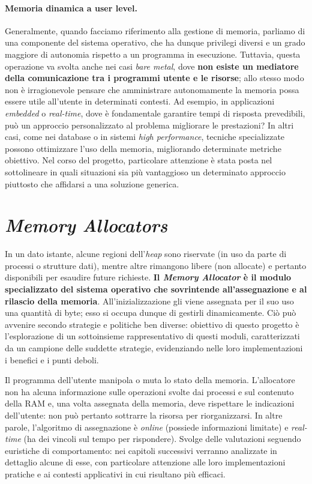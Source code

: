 \paragraph{Memoria dinamica a user level.} 
Generalmente, quando facciamo riferimento alla gestione di memoria, parliamo di una componente del sistema operativo, che ha dunque privilegi diversi e un grado maggiore di autonomia rispetto a un programma in esecuzione. Tuttavia, questa operazione va svolta anche nei casi \textit{bare metal}, dove \textbf{non esiste un mediatore della comunicazione tra i programmi utente e le risorse}; allo stesso modo non è irragionevole pensare che amministrare autonomamente la memoria possa essere utile all'utente in determinati contesti. Ad esempio, in applicazioni \textit{embedded} o \textit{real-time}, dove è fondamentale garantire tempi di risposta prevedibili, può un approccio personalizzato al problema migliorare le prestazioni? In altri casi, come nei database o in sistemi \textit{high performance}, tecniche specializzate possono ottimizzare l'uso della memoria, migliorando determinate metriche obiettivo. Nel corso del progetto, particolare attenzione è stata posta nel sottolineare in quali situazioni sia più vantaggioso un determinato approccio piuttosto che affidarsi a una soluzione generica.

\section{\textit{Memory Allocators}}

In un dato istante, alcune regioni dell'\textit{heap} sono riservate (in uso da parte di processi o strutture dati), mentre altre rimangono libere (non allocate) e pertanto disponibili per esaudire future richieste. \textbf{Il \textit{Memory Allocator} è il modulo specializzato del sistema operativo che sovrintende all'assegnazione e al rilascio della memoria}. All'inizializzazione gli viene assegnata per il suo uso una quantità di byte; esso si occupa dunque di gestirli dinamicamente. Ciò può avvenire secondo strategie e politiche ben diverse: obiettivo di questo progetto è l'esplorazione di un sottoinsieme rappresentativo di questi moduli, caratterizzati da un campione delle suddette strategie, evidenziando nelle loro implementazioni i benefici e i punti deboli.

Il programma dell'utente manipola o muta lo stato della memoria. L'allocatore non ha alcuna informazione sulle operazioni svolte dai processi e sul contenuto della RAM e, una volta assegnata della memoria, deve rispettare le indicazioni dell'utente: non può pertanto sottrarre la risorsa per riorganizzarsi. In altre parole, l'algoritmo di assegnazione è \textit{online} (possiede informazioni limitate) e \textit{real-time} (ha dei vincoli sul tempo per rispondere). Svolge delle valutazioni seguendo euristiche di comportamento: nei capitoli successivi verranno analizzate in dettaglio alcune di esse, con particolare attenzione alle loro implementazioni pratiche e ai contesti applicativi in cui risultano più efficaci. 

